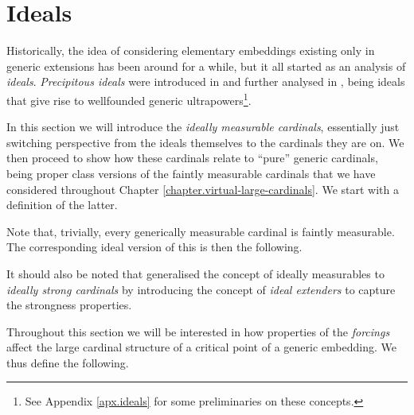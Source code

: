\documentclass[../../main]{subfiles}
\begin{document}
\section{Ideals}

Historically, the idea of considering elementary embeddings existing only in generic extensions has been around for a while, but it all started as an analysis of \textit{ideals}. \textit{Precipitous ideals} were introduced in \cite{IdealGame} and further analysed in \cite{Precipitous}, being ideals that give rise to wellfounded generic ultrapowers\footnote{See Appendix \ref{apx.ideals} for some preliminaries on these concepts.}.

\qquad In this section we will introduce the \textit{ideally measurable cardinals}, essentially just switching perspective from the ideals themselves to the cardinals they are on. We then proceed to show how these cardinals relate to ``pure'' generic cardinals, being proper class versions of the faintly measurable cardinals that we have considered throughout Chapter \ref{chapter.virtual-large-cardinals}. We start with a definition of the latter.


Note that, trivially, every generically measurable cardinal is faintly measurable. The corresponding ideal version of this is then the following.


It should also be noted that \cite{claverie-ideal-extenders} generalised the concept of ideally measurables to \textit{ideally strong cardinals} by introducing the concept of \textit{ideal extenders} to capture the strongness properties.

\qquad Throughout this section we will be interested in how properties of the \textit{forcings} affect the large cardinal structure of a critical point of a generic embedding. We thus define the following.

\end{document}
